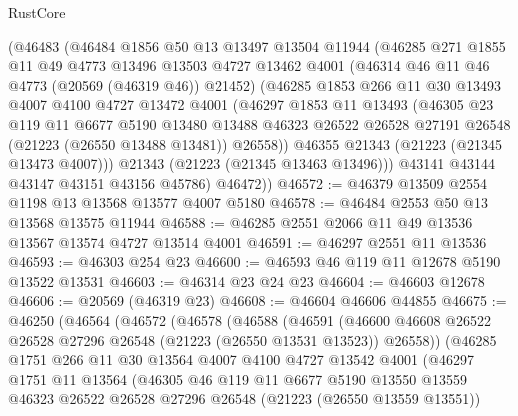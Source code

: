 \begin{lexlean}{RustCore}
\begin{coremodule}
      (@46483
        (@46484
          @1856
          @50
          @13
          @13497
          @13504
          @11944
          (@46285
            @271
            @1855
            @11
            @49
            @4773
            @13496
            @13503
            @4727
            @13462
            @4001
            (@46314 @46 @11 @46 @4773 (@20569 (@46319 @46)) @21452)
            (@46285
              @1853
              @266
              @11
              @30
              @13493
              @4007
              @4100
              @4727
              @13472
              @4001
              (@46297
                @1853
                @11
                @13493
                (@46305
                  @23
                  @119
                  @11
                  @6677
                  @5190
                  @13480
                  @13488
                  @46323
                  @26522
                  @26528
                  @27191
                  @26548
                  (@21223 (@26550 @13488 @13481))
                  @26558))
              @46355
              @21343
              (@21223 (@21345 @13473 @4007)))
            @21343
            (@21223 (@21345 @13463 @13496)))
          @43141
          @43144
          @43147
          @43151
          @43156
          @45786)
        @46472))
@46572 := @46379 @13509 @2554 @1198 @13 @13568 @13577 @4007 @5180
@46578 := @46484 @2553 @50 @13 @13568 @13575 @11944
@46588 := @46285 @2551 @2066 @11 @49 @13536 @13567 @13574 @4727 @13514 @4001
@46591 := @46297 @2551 @11 @13536
@46593 := @46303 @254 @23
@46600 := @46593 @46 @119 @11 @12678 @5190 @13522 @13531
@46603 := @46314 @23 @24 @23
@46604 := @46603 @12678
@46606 := @20569 (@46319 @23)
@46608 := @46604 @46606 @44855
@46675 := @46250
    (@46564
      (@46572
        (@46578
          (@46588
            (@46591
              (@46600 @46608 @26522 @26528 @27296 @26548 (@21223 (@26550 @13531 @13523)) @26558))
            (@46285
              @1751
              @266
              @11
              @30
              @13564
              @4007
              @4100
              @4727
              @13542
              @4001
              (@46297
                @1751
                @11
                @13564
                (@46305
                  @46
                  @119
                  @11
                  @6677
                  @5190
                  @13550
                  @13559
                  @46323
                  @26522
                  @26528
                  @27296
                  @26548
                  (@21223 (@26550 @13559 @13551))

\end{coremodule}
\end{lexlean}
